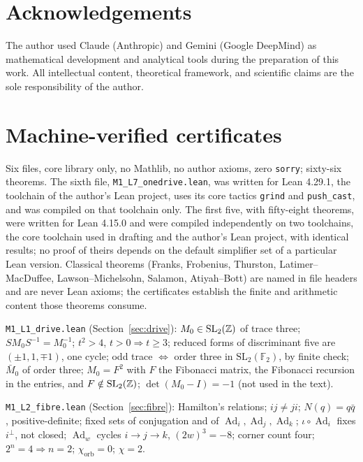 \documentclass[11pt,a4paper]{article}
\theoremstyle{plain}
\theoremstyle{definition}
\theoremstyle{remark}
\newcommand{\Ad}{\operatorname{Ad}}
\begin{document}
\section*{Acknowledgements}
The author used Claude (Anthropic) and Gemini (Google DeepMind) as mathematical development and analytical tools during the preparation of this work. All intellectual content, theoretical framework, and scientific claims are the sole responsibility of the author.

\appendix

\section{Machine-verified certificates}\label{app:lean}

Six files, core library only, no Mathlib, no author axioms, zero \texttt{sorry}; sixty-six theorems. The sixth file, \texttt{M1\_L7\_onedrive.lean}, was written for Lean 4.29.1, the toolchain of the author's Lean project, uses its core tactics \texttt{grind} and \texttt{push\_cast}, and was compiled on that toolchain only. The first five, with fifty-eight theorems, were written for Lean 4.15.0 and were compiled independently on two toolchains, the core toolchain used in drafting and the author's Lean project, with identical results; no proof of theirs depends on the default simplifier set of a particular Lean version. Classical theorems (Franks, Frobenius, Thurston, Latimer--MacDuffee, Lawson--Michelsohn, Salamon, Atiyah--Bott) are named in file headers and are never Lean axioms; the certificates establish the finite and arithmetic content those theorems consume.

\texttt{M1\_L1\_drive.lean} (Section~\ref{sec:drive}): $M_{0}\in\mathrm{SL}_{2}(\mathbb{Z})$ of trace three; $SM_{0}S^{-1}=M_{0}^{-1}$; $t^{2}>4$, $t>0\Rightarrow t\geq3$; reduced forms of discriminant five are $(\pm1,1,\mp1)$, one cycle; odd trace $\Leftrightarrow$ order three in $\mathrm{SL}_{2}(\mathbb{F}_{2})$, by finite check; $\bar M_{0}$ of order three; $M_{0}=F^{2}$ with $F$ the Fibonacci matrix, the Fibonacci recursion in the entries, and $F\notin\mathrm{SL}_{2}(\mathbb{Z})$; $\det(M_{0}-I)=-1$ (not used in the text).

\texttt{M1\_L2\_fibre.lean} (Section~\ref{sec:fibre}): Hamilton's relations; $ij\neq ji$; $N(q)=q\bar q$, positive-definite; fixed sets of conjugation and of $\Ad_{i},\Ad_{j},\Ad_{k}$; $\iota\circ\Ad_{i}$ fixes $i^{\perp}$, not closed; $\Ad_{w}$ cycles $i\to j\to k$, $(2w)^{3}=-8$; corner count four; $2^{n}=4\Rightarrow n=2$; $\chi_{\mathrm{orb}}=0$; $\chi=2$.
\end{document}
